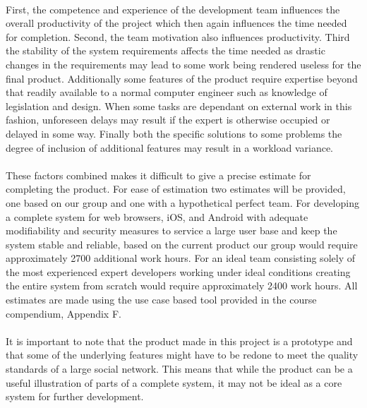 \paragraph{} First, the competence and experience of the development team influences the overall productivity of the project which then again influences the time needed for completion. Second, the team motivation also influences productivity. Third the stability of the system requirements affects the time needed as drastic changes in the requirements may lead to some work being rendered useless for the final product. Additionally some features of the product require expertise beyond that readily available to a normal computer engineer such as knowledge of legislation and design. When some tasks are dependant on external work in this fashion, unforeseen delays may result if the expert is otherwise occupied or delayed in some way. Finally both the specific solutions to some problems the degree of inclusion of additional features may result in a workload variance. 
\paragraph{} These factors combined makes it difficult to give a precise estimate for completing the product. For ease of estimation two estimates will be provided, one based on our group and one with a hypothetical perfect team. For developing a complete system for web browsers, iOS, and Android with adequate modifiability and security measures to service a large user base and keep the system stable and reliable, based on the current product our group would require approximately 2700 additional work hours. For an ideal team consisting solely of the most experienced expert developers working under ideal conditions creating the entire system from scratch would require approximately 2400 work hours. All estimates are made using the use case based tool provided in the course compendium, Appendix F. \cite{booklet:CDPCompendium}
\paragraph{} It is important to note that the product made in this project is a prototype and that some of the underlying features might have to be redone to meet the quality standards of a large social network. This means that while the product can be a useful illustration of parts of a complete system, it may not be ideal as a core system for further development.

